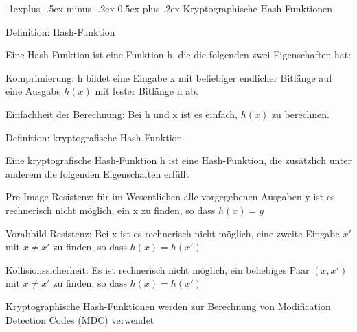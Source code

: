 \documentclass[a4paper]{article}
\makeatletter
\renewcommand{\subsection}{\@startsection{subsection}{2}{0mm}%
 {-1explus -.5ex minus -.2ex}%
 {0.5ex plus .2ex}%
 {\normalfont\normalsize\bfseries}}
\makeatother
\begin{document}
\begin{multicols}{3}
      \subsection{Kryptographische Hash-Funktionen}
      \begin{itemize*}
            \item Definition: Hash-Funktion
            \begin{itemize*}
                  \item Eine Hash-Funktion ist eine Funktion h, die die folgenden zwei Eigenschaften hat:
                  \begin{itemize*}
                        \item Komprimierung: h bildet eine Eingabe x mit beliebiger endlicher Bitlänge auf eine Ausgabe $h(x)$ mit fester Bitlänge n ab.
                        \item Einfachheit der Berechnung: Bei h und x ist es einfach, $h(x)$ zu berechnen.
                  \end{itemize*}
            \end{itemize*}
            \item Definition: kryptografische Hash-Funktion
            \begin{itemize*}
                  \item Eine kryptografische Hash-Funktion h ist eine Hash-Funktion, die zusätzlich unter anderem die folgenden Eigenschaften erfüllt
                  \item Pre-Image-Resistenz: für im Wesentlichen alle vorgegebenen Ausgaben y ist es rechnerisch nicht möglich, ein x zu finden, so dass $h(x)=y$
                  \item Vorabbild-Resistenz: Bei x ist es rechnerisch nicht möglich, eine zweite Eingabe $x'$ mit $x\not= x'$ zu finden, so dass $h(x)=h(x')$
                  \item Kollisionssicherheit: Es ist rechnerisch nicht möglich, ein beliebiges Paar $(x,x')$ mit $x\not= x'$ zu finden, so dass $h(x)=h(x')$
                  \item Kryptographische Hash-Funktionen werden zur Berechnung von Modification Detection Codes (MDC) verwendet
            \end{itemize*}
      \end{itemize*}


\end{multicols}
\end{document}
